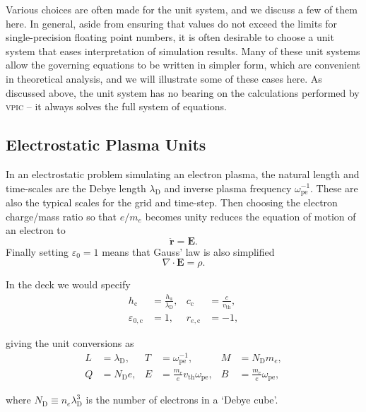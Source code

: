 \documentclass[twocolumn,10pt]{article}
\renewcommand{\vec}[1]{\mathbf{#1}}
\newcommand{\omegap}{\omega_{\mathrm{pe}}}
\newcommand{\vth}{v_{\mathrm{th}}}
\newcommand{\ldebye}{\lambda_{\mathrm{D}}}
\begin{document}
Various choices are often made for the unit system, and we discuss a few of them here.
In general, aside from ensuring that values do not exceed the limits for single-precision floating point numbers, it is often desirable to choose a unit system that eases interpretation of simulation results.
Many of these unit systems allow the governing equations to be written in simpler form, which are convenient in theoretical analysis, and we will illustrate some of these cases here.
As discussed above, the unit system has no bearing on the calculations performed by \textsc{vpic} -- it always solves the full system of equations.

\subsection{Electrostatic Plasma Units}

In an electrostatic problem simulating an electron plasma, the natural length and time-scales are the Debye length $\ldebye$ and inverse plasma frequency $\omegap^{-1}$.
These are also the typical scales for the grid and time-step.
Then choosing the electron charge/mass ratio so that $e/m_e$ becomes unity reduces the equation of motion of an electron to
\begin{equation*}
	\ddot{\vec{r}} = \vec{E}.
\end{equation*}
Finally setting $\varepsilon_0=1$ means that Gauss' law is also simplified
\begin{equation*}
	\nabla \cdot \vec{E} = \rho.
\end{equation*}

\noindent In the deck we would specify
\begin{align*}
	h_{\mathrm{c}}             &= \frac{h_{\mathrm{u}}}{\ldebye}, &
	c_{\mathrm{c}}             &= \frac{c}{\vth},    \\
	\varepsilon_{0,\mathrm{c}} &= 1,                              &
	r_{e,\mathrm{c}}           &= -1,
\end{align*}

\noindent giving the unit conversions as
\begin{align*}
	L &= \ldebye,                  &
	T &= \omegap^{-1},             &
	M &= N_{\mathrm{D}}m_e,        \\
	Q &= N_{\mathrm{D}}e,          &
	E &= \frac{m_e}{e}\vth\omegap, &
	B &= \frac{m_e}{e}\omegap,
\end{align*}

\noindent where $N_{\mathrm{D}} \equiv n_e\ldebye^3$ is the number of electrons in a `Debye cube'.
\end{document}
